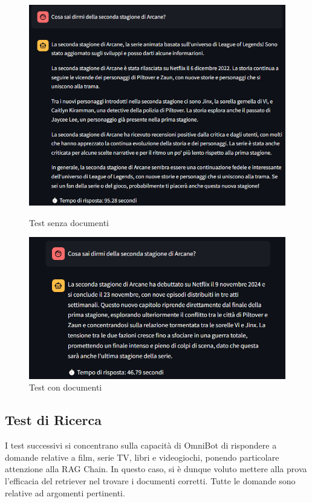\begin{figure}[H]
    \centering
    \includegraphics[width=\textwidth]{Images/cap5/arcane_no_docs.PNG}
    \caption{Test senza documenti}
    \label{fig:rag1}
    \vspace{0.5cm}
    \includegraphics[width=\textwidth]{Images/cap5/arcane_docs.PNG}
    \caption{Test con documenti}
    \label{fig:rag2}
\end{figure}

\subsection{Test di Ricerca}
I test successivi si concentrano sulla capacità di OmniBot di rispondere a domande relative a film, serie TV, libri e videogiochi, ponendo particolare attenzione alla RAG Chain. In questo caso, si è dunque voluto mettere alla prova l'efficacia del retriever nel trovare i documenti corretti. Tutte le domande sono relative ad argomenti pertinenti.

